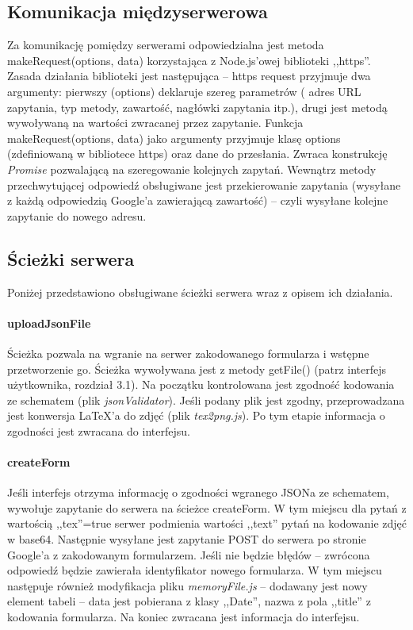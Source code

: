 \subsection{Komunikacja międzyserwerowa}
Za komunikację pomiędzy serwerami odpowiedzialna jest metoda makeRequest(options, data) korzystająca z Node.js'owej biblioteki ,,https''. Zasada działania biblioteki jest następująca -- https request przyjmuje dwa argumenty: pierwszy (options) deklaruje szereg parametrów ( adres URL zapytania, typ metody, zawartość, nagłówki zapytania itp.), drugi jest metodą wywoływaną na wartości zwracanej przez zapytanie. 
\ind Funkcja makeRequest(options, data) jako argumenty przyjmuje klasę options (zdefiniowaną w bibliotece https) oraz dane do przesłania. Zwraca konstrukcję \textit{Promise} pozwalającą na szeregowanie kolejnych zapytań. Wewnątrz metody przechwytującej odpowiedź obsługiwane jest przekierowanie zapytania (wysyłane z każdą odpowiedzią Google'a zawierającą zawartość) -- czyli wysyłane kolejne zapytanie do nowego adresu.
\subsection{Ścieżki serwera}
Poniżej przedstawiono obsługiwane ścieżki serwera wraz z opisem ich działania.
\paragraph{uploadJsonFile} Ścieżka pozwala na wgranie na serwer zakodowanego formularza i wstępne przetworzenie go. Ścieżka wywoływana jest z metody getFile() (patrz interfejs użytkownika, rozdział 3.1). Na początku kontrolowana jest zgodność kodowania ze schematem (plik \textit{jsonValidator}). Jeśli podany plik jest zgodny, przeprowadzana jest konwersja \LaTeX{}'a do zdjęć (plik \textit{tex2png.js}). Po tym etapie informacja o zgodności jest zwracana do interfejsu.
\paragraph{createForm} Jeśli interfejs otrzyma informację o zgodności wgranego JSONa ze schematem, wywołuje zapytanie do serwera na ścieżce createForm. W tym miejscu dla pytań z wartością ,,tex''=true serwer podmienia wartości ,,text'' pytań na kodowanie zdjęć w base64. Następnie wysyłane jest zapytanie POST do serwera po stronie Google'a z zakodowanym formularzem. Jeśli nie będzie błędów -- zwrócona odpowiedź będzie zawierała identyfikator nowego formularza. W tym miejscu następuje również modyfikacja pliku \textit{memoryFile.js} -- dodawany jest nowy element tabeli -- data jest pobierana z klasy ,,Date'', nazwa z pola ,,title'' z kodowania formularza. Na koniec zwracana jest informacja do interfejsu.
